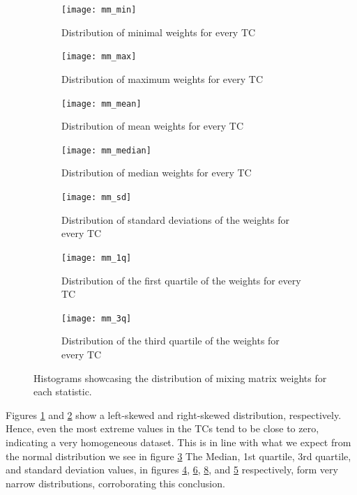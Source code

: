 \begin{figure}[H]
    \centering
    \begin{subfigure}[t]{.3\textwidth}
        \centering
        \texttt{[image: mm\_min]}
        \caption{Distribution of minimal weights for every TC}
        \label{plt:mm_min}
    \end{subfigure}\quad
    \begin{subfigure}[t]{.3\textwidth}
        \centering
        \texttt{[image: mm\_max]}
        \caption{Distribution of maximum weights for every TC}
        \label{plt:mm_max}
    \end{subfigure}\quad
    \begin{subfigure}[t]{.3\textwidth}
        \centering
        \texttt{[image: mm\_mean]}
        \caption{Distribution of mean weights for every TC}
        \label{plt:mm_mean}
    \end{subfigure}
    \begin{subfigure}[t]{.3\textwidth}
        \centering
        \texttt{[image: mm\_median]}
        \caption{Distribution of median weights for every TC}
        \label{plt:mm_median}
    \end{subfigure}\quad
    \begin{subfigure}[t]{.3\textwidth}
        \centering
        \texttt{[image: mm\_sd]}
        \caption{Distribution of standard deviations of the weights for every TC}
        \label{plt:mm_sd}
    \end{subfigure}\quad
    \begin{subfigure}[t]{.3\textwidth}
        \centering
        \texttt{[image: mm\_1q]}
        \caption{Distribution of the first quartile of the weights for every TC}
        \label{plt:mm_1q}
    \end{subfigure}
    \begin{subfigure}[t]{.3\textwidth}
        \centering
        \texttt{[image: mm\_3q]}
        \caption{Distribution of the third quartile of the weights for every TC}
        \label{plt:mm_3q}
    \end{subfigure}\quad
\caption{Histograms showcasing the distribution of mixing matrix weights for each statistic.}
\end{figure}

Figures \ref{plt:mm_min} and \ref{plt:mm_max} show a left-skewed and right-skewed distribution, respectively.
Hence, even the most extreme values in the TCs tend to be close to zero, indicating a very homogeneous dataset.
This is in line with what we expect from the normal distribution we see in figure \ref{plt:mm_mean}
The Median, 1st quartile, 3rd quartile, and standard deviation values, in figures \ref{plt:mm_median}, \ref{plt:mm_1q}, \ref{plt:mm_3q}, and \ref{plt:mm_sd} respectively, form very narrow distributions, corroborating this conclusion.

